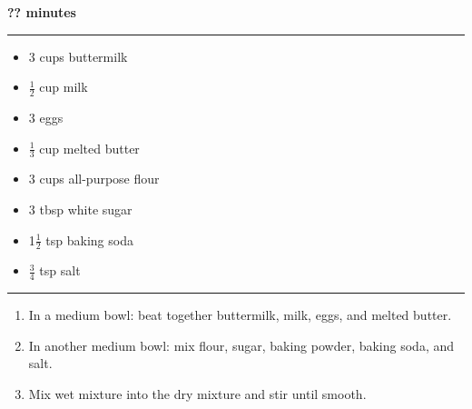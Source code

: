  \hfill {\large \textbf{?? minutes}}

\vspace{15pt} \hrule \vspace{15pt}
\begin{itemize}
	\item 3 cups buttermilk
	\item $\frac{1}{2}$ cup milk
	\item 3 eggs
	\item $\frac{1}{3}$ cup melted butter
	\item 3 cups all-purpose flour
	\item 3 tbsp white sugar
	\item 1$\frac{1}{2}$ tsp baking soda
	\item $\frac{3}{4}$ tsp salt
\end{itemize}

\vspace{15pt} \hrule \vspace{15pt}
\begin{enumerate}
	\item In a medium bowl: beat together buttermilk, milk, eggs, and melted butter.
	\item In another medium bowl: mix flour, sugar, baking powder, baking soda, and salt.
	\item Mix wet mixture into the dry mixture and stir until smooth.
\end{enumerate}
